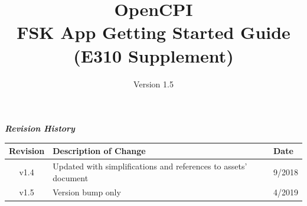\def\docTitle{OpenCPI\\ FSK App Getting Started Guide\\ (E310 Supplement)}
\def\docVersion{1.5}

\date{Version \docVersion} %
\title{\docTitle}
\usepackage[T1]{fontenc} %
\usepackage{graphicx}
\graphicspath{ {figures/} }
\usepackage{textcomp}

\maketitle
\newpage

	\begin{center}
	\textit{\textbf{Revision History}}
		\begin{table}[H]
		\label{table:revisions} %
			\begin{tabularx}{\textwidth}{|c|X|l|}
			\hline
			\rowcolor{blue}
			\textbf{Revision} & \textbf{Description of Change} & \textbf{Date} \\
		    \hline
			v1.4 & Updated with simplifications and references to assets' document & 9/2018 \\
			\hline
			v1.5 & Version bump only & 4/2019 \\
			\hline
			\end{tabularx}
		\end{table}
	\end{center}

